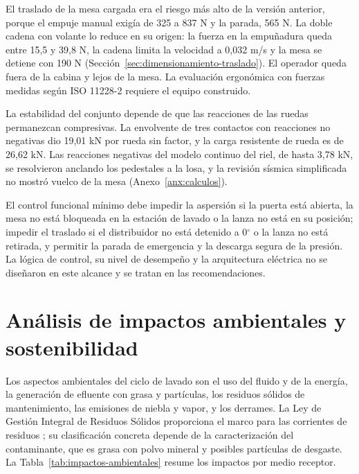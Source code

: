 El traslado de la mesa cargada era el riesgo más alto de la versión anterior, porque el empuje manual exigía de 325 a 837 N y la parada, 565 N. La doble cadena con volante lo reduce en su origen: la fuerza en la empuñadura queda entre 15,5 y 39,8 N, la cadena limita la velocidad a 0,032 m/s y la mesa se detiene con 190 N (Sección~\ref{sec:dimensionamiento-traslado}). El operador queda fuera de la cabina y lejos de la mesa. La evaluación ergonómica con fuerzas medidas según ISO 11228-2 \cite{iso11228} requiere el equipo construido.

La estabilidad del conjunto depende de que las reacciones de las ruedas permanezcan compresivas. La envolvente de tres contactos con reacciones no negativas dio 19,01 kN por rueda sin factor, y la carga resistente de rueda es de 26,62 kN. Las reacciones negativas del modelo continuo del riel, de hasta 3,78 kN, se resolvieron anclando los pedestales a la losa, y la revisión sísmica simplificada no mostró vuelco de la mesa (Anexo~\ref{anx:calculos}).

El control funcional mínimo debe impedir la aspersión si la puerta está abierta, la mesa no está bloqueada en la estación de lavado o la lanza no está en su posición; impedir el traslado si el distribuidor no está detenido a 0$^\circ$ o la lanza no está retirada, y permitir la parada de emergencia y la descarga segura de la presión. La lógica de control, su nivel de desempeño y la arquitectura eléctrica no se diseñaron en este alcance y se tratan en las recomendaciones.

\section{Análisis de impactos ambientales y sostenibilidad}

Los aspectos ambientales del ciclo de lavado son el uso del fluido y de la energía, la generación de efluente con grasa y partículas, los residuos sólidos de mantenimiento, las emisiones de niebla y vapor, y los derrames. La Ley de Gestión Integral de Residuos Sólidos proporciona el marco para las corrientes de residuos \cite{dleg1278}; su clasificación concreta depende de la caracterización del contaminante, que es grasa con polvo mineral y posibles partículas de desgaste. La Tabla~\ref{tab:impactos-ambientales} resume los impactos por medio receptor.

